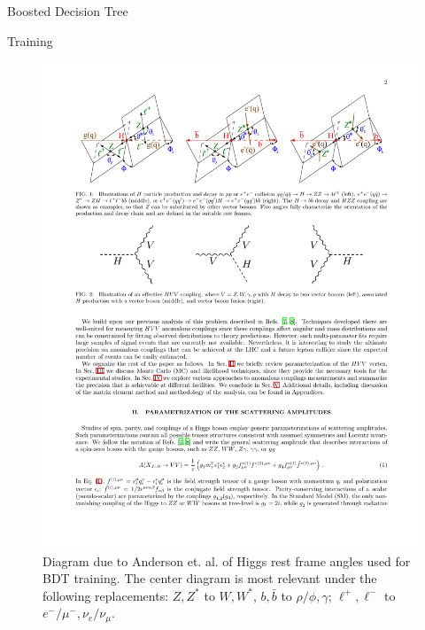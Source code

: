 \begin{section}{Boosted Decision Tree}
\begin{subsection}{Training}
\begin{figure}[htb]
\begin{center}
\includegraphics[width=.95\linewidth]{Dissertation/fig/magic-angles.pdf}
\end{center}
\caption{Diagram due to Anderson et. al. \cite{magic-angles-cite} of Higgs rest frame angles used for BDT training. The center diagram is most relevant under the following replacements: $Z, Z^*$ to $W, W^*$, $b, \bar{b}$ to $\rho/\phi, \gamma$; $\ell^+,\ell^-$ to $e^-/\mu^-, \nu_e/ \nu_\mu$.}
\label{fig:magic-angles}
\end{figure}


\end{subsection}
\end{section}
